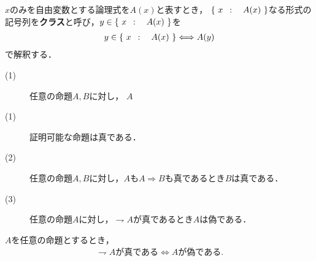 	\begin{screen}
		\begin{dfn}[クラス]
			$x$のみを自由変数とする論理式を$A(x)$と表すとき，
			$\left\{\ x\ \, : \quad A(x)\ \right\}$なる形式の記号列を{\bf クラス}と呼び，$y \in \left\{\ x\ \, : \quad A(x)\ \right\}$を
			\begin{align}
				y \in \left\{\ x\ \, : \quad A(x)\ \right\} \Longleftrightarrow A(y)
			\end{align}
			で解釈する．
		\end{dfn}
	\end{screen}
	
	\begin{screen}
		\begin{axm}[命題論理の公理]\mbox{}
			\begin{description}
				\item[(1)] 任意の命題$A,B$に対し，
					$A $
				\item[(1)] 証明可能な命題は真である．
				\item[(2)] 任意の命題$A,B$に対し，$A$も$A \Longrightarrow B$も真であるとき$B$は真である．
				\item[(3)] 任意の命題$A$に対し，$\rightharpoondown A$が真であるとき$A$は偽である．
			\end{description}
		\end{axm}
	\end{screen}
	
	\begin{screen}
		\begin{thm}
			$A$を任意の命題とするとき，
			\begin{align}
				\mbox{$\rightharpoondown A$が真である} \Longleftrightarrow \mbox{$A$が偽である}.
			\end{align}
		\end{thm}
	\end{screen}